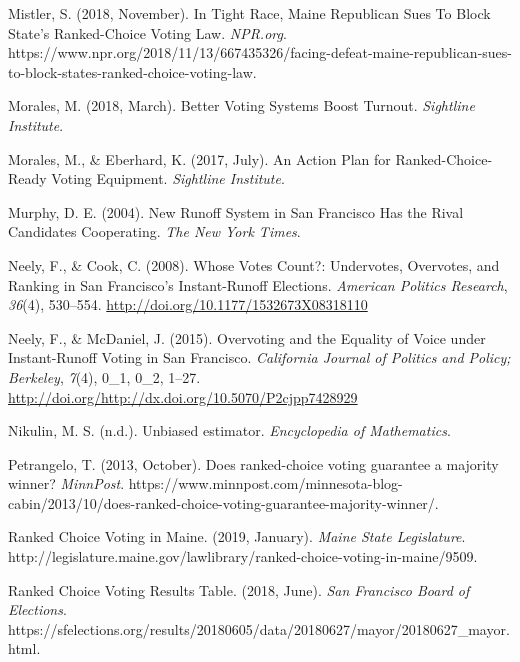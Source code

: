 \documentclass[12pt,twoside]{reedthesis}
\begin{document}
\leavevmode\hypertarget{ref-mistler_tight_2018}{}%
Mistler, S. (2018, November). In Tight Race, Maine Republican Sues To Block State's Ranked-Choice Voting Law. \emph{NPR.org}. https://www.npr.org/2018/11/13/667435326/facing-defeat-maine-republican-sues-to-block-states-ranked-choice-voting-law.

\leavevmode\hypertarget{ref-morales_better_2018}{}%
Morales, M. (2018, March). Better Voting Systems Boost Turnout. \emph{Sightline Institute}.

\leavevmode\hypertarget{ref-morales_action_2017}{}%
Morales, M., \& Eberhard, K. (2017, July). An Action Plan for Ranked-Choice-Ready Voting Equipment. \emph{Sightline Institute}.

\leavevmode\hypertarget{ref-murphy_new_2004}{}%
Murphy, D. E. (2004). New Runoff System in San Francisco Has the Rival Candidates Cooperating. \emph{The New York Times}.

\leavevmode\hypertarget{ref-neely_whose_2008}{}%
Neely, F., \& Cook, C. (2008). Whose Votes Count?: Undervotes, Overvotes, and Ranking in San Francisco's Instant-Runoff Elections. \emph{American Politics Research}, \emph{36}(4), 530--554. \url{http://doi.org/10.1177/1532673X08318110}

\leavevmode\hypertarget{ref-neely_overvoting_2015}{}%
Neely, F., \& McDaniel, J. (2015). Overvoting and the Equality of Voice under Instant-Runoff Voting in San Francisco. \emph{California Journal of Politics and Policy; Berkeley}, \emph{7}(4), 0\_1, 0\_2, 1--27. \url{http://doi.org/http://dx.doi.org/10.5070/P2cjpp7428929}

\leavevmode\hypertarget{ref-nikulin_unbiased_nodate}{}%
Nikulin, M. S. (n.d.). Unbiased estimator. \emph{Encyclopedia of Mathematics}.

\leavevmode\hypertarget{ref-petrangelo_does_2013}{}%
Petrangelo, T. (2013, October). Does ranked-choice voting guarantee a majority winner? \emph{MinnPost}. https://www.minnpost.com/minnesota-blog-cabin/2013/10/does-ranked-choice-voting-guarantee-majority-winner/.

\leavevmode\hypertarget{ref-noauthor_ranked_2019}{}%
Ranked Choice Voting in Maine. (2019, January). \emph{Maine State Legislature}. http://legislature.maine.gov/lawlibrary/ranked-choice-voting-in-maine/9509.

\leavevmode\hypertarget{ref-noauthor_ranked_2018}{}%
Ranked Choice Voting Results Table. (2018, June). \emph{San Francisco Board of Elections}. https://sfelections.org/results/20180605/data/20180627/mayor/20180627\_mayor.html.
\end{document}
